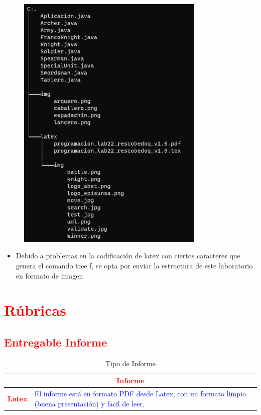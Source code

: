 \documentclass{article}
\begin{document}
	\begin{figure}[H]
		\centering
		\includegraphics[width=0.8\textwidth,keepaspectratio]{img/tree.jpg}
	\end{figure}	
	
	\begin{itemize}	
		\item Debido a problemas en la codificación de latex con ciertos caracteres que genera el comando tree f, se opta 
		por enviar la estructura de este laboratorio en formato de imagen
	\end{itemize}
	

   
	
	\section{\textcolor{red}{Rúbricas}}
	
	\subsection{\textcolor{red}{Entregable Informe}}
	\begin{table}[H]
		\caption{Tipo de Informe}
		\setlength{\tabcolsep}{0.5em} %
		{\renewcommand{\arraystretch}{1.5}%
			\begin{tabular}{|p{3cm}|p{12cm}|}
				\hline
				\multicolumn{2}{|c|}{\textbf{\textcolor{red}{Informe}}}  \\
				\hline 
				\textbf{\textcolor{red}{Latex}} & \textcolor{blue}{El informe está en formato PDF desde Latex,  con un formato limpio (buena presentación) y facil de leer.}   \\ 
				\hline 
				
				
			\end{tabular}
		}
	\end{table}
	
\end{document}
